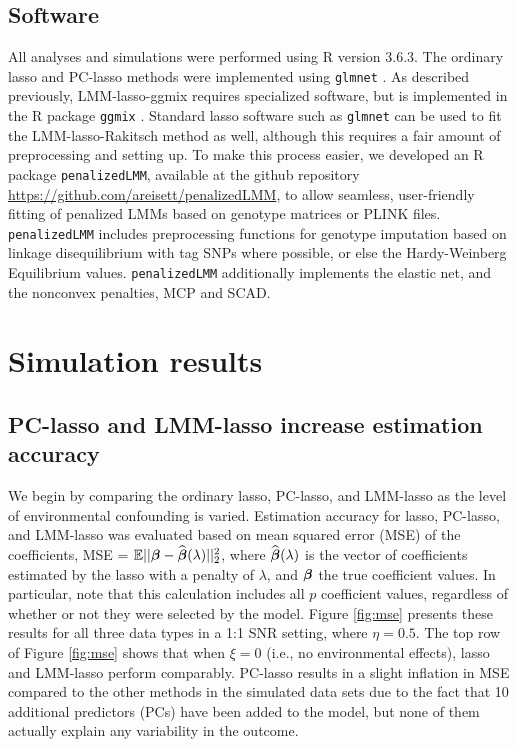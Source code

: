 \subsection{Software}
\label{sec:software}

All analyses and simulations were performed using R version 3.6.3. The ordinary lasso and PC-lasso methods were implemented using \texttt{glmnet} \citep{glmnet}. As described previously, LMM-lasso-ggmix requires specialized software, but is implemented in the R package \texttt{ggmix} \citep{bhatnagar2020simultaneous}. Standard lasso software such as \texttt{glmnet} can be used to fit the LMM-lasso-Rakitsch method as well, although this requires a fair amount of preprocessing and setting up. To make this process easier, we developed an R package \texttt{penalizedLMM}, available at the github repository \url{https://github.com/areisett/penalizedLMM}, to allow seamless, user-friendly fitting of penalized LMMs based on genotype matrices or PLINK files. \texttt{penalizedLMM} includes preprocessing functions for genotype imputation based on linkage disequilibrium with tag SNPs where possible, or else the Hardy-Weinberg Equilibrium values. \texttt{penalizedLMM} additionally implements the elastic net, and the nonconvex penalties, MCP and SCAD. 

\section{Simulation results} \label{sec:results}

\subsection{PC-lasso and LMM-lasso increase estimation accuracy}
\label{sec:sim-mse}

We begin by comparing the ordinary lasso, PC-lasso, and LMM-lasso as the level of environmental confounding is varied. Estimation accuracy for lasso, PC-lasso, and LMM-lasso was evaluated based on mean squared error (MSE) of the coefficients, MSE = $\mathbb{E}||\boldsymbol{\beta}{} - \widehat{\boldsymbol{\beta}{}}(\lambda)||^2_2$, where $\widehat{\boldsymbol{\beta}{}}(\lambda)$ is the vector of coefficients estimated by the lasso with a penalty of $\lambda$, and $\boldsymbol{\beta}{}$ the true coefficient values.  In particular, note that this calculation includes all $p$ coefficient values, regardless of whether or not they were selected by the model.
Figure \ref{fig:mse} presents these results for all three data types in a 1:1 SNR setting, where $\eta = 0.5$. The top row of Figure \ref{fig:mse} shows that when $\xi = 0$ (i.e., no environmental effects), lasso and LMM-lasso perform comparably. PC-lasso results in a slight inflation in MSE compared to the other methods in the simulated data sets due to the fact that 10 additional predictors (PCs) have been added to the model, but none of them actually explain any variability in the outcome. 

